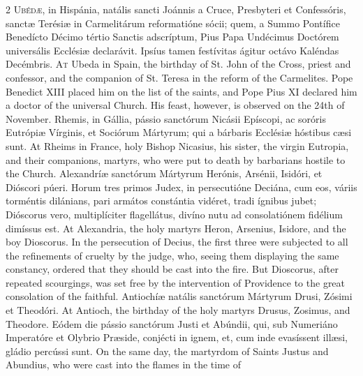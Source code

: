 \begin{paracol}{2}
\lettrine[lines=2]{U}{bédæ,} in Hispánia, 
 natális sancti Joánnis a Cruce, Presbyteri et Confessóris, sanctæ Terésiæ in 
 Carmelitárum reformatióne sócii; quem, a Summo Pontífice Benedícto Décimo 
 tértio Sanctis adscríptum, Pius Papa Undécimus Doctórem universális Ecclésiæ 
 declarávit. Ipsíus tamen festívitas ágitur octávo Kaléndas Decémbris.
\switchcolumn
{}
\lettrine[lines=2]{A}{t} Ubeda in Spain, the birthday of 
 St. John of the Cross, priest and confessor, and the companion of St. Teresa 
 in the reform of the Carmelites. Pope Benedict XIII placed him on the 
 list of the saints, and Pope Pius XI declared him a doctor of the universal 
 Church. His feast, however, is observed on the 24th of November.
\switchcolumn*
{}
Rhemis, in Gállia, 
 pássio sanctórum Nicásii Epíscopi, ac soróris Eutrópiæ Vírginis, et Sociórum 
 Mártyrum; qui a bárbaris Ecclésiæ hóstibus cæsi sunt.
\switchcolumn
{}
At Rheims in France, holy Bishop 
 Nicasius, his sister, the virgin Eutropia, and their companions, martyrs, 
 who were put to death by barbarians hostile to the Church.
\switchcolumn*
{}
Alexandríæ sanctórum 
 Mártyrum Herónis, Arsénii, Isidóri, et Dióscori púeri. Horum tres 
 primos Judex, in persecutióne Deciána, cum eos, váriis torméntis dilánians, 
 pari armátos constántia vidéret, tradi ígnibus jubet; Dióscorus vero, 
 multiplíciter flagellátus, divíno nutu ad consolatiónem fidélium dimíssus 
 est.
\switchcolumn
{}
At Alexandria, the holy martyrs 
 Heron, Arsenius, Isidore, and the boy Dioscorus. In the persecution of 
 Decius, the first three were subjected to all the refinements of cruelty by 
 the judge, who, seeing them displaying the same constancy, ordered that they 
 should be cast into the fire. But Dioscorus, after repeated scourgings, 
 was set free by the intervention of Providence to the great consolation of 
 the faithful.
\switchcolumn*
{}
Antiochíæ natális 
 sanctórum Mártyrum Drusi, Zósimi et Theodóri.
\switchcolumn
{}
At Antioch, the birthday of the holy 
 martyrs Drusus, Zosimus, and Theodore.
\switchcolumn*
{}
Eódem die pássio 
 sanctórum Justi et Abúndii, qui, sub Numeriáno Imperatóre et Olybrio Præside, 
 conjécti in ignem, et, cum inde evasíssent illæsi, gládio percússi sunt.
\switchcolumn
{}
On the same day, the martyrdom of 
 Saints Justus and Abundius, who were cast into the flames in the time of 

\end{paracol}
